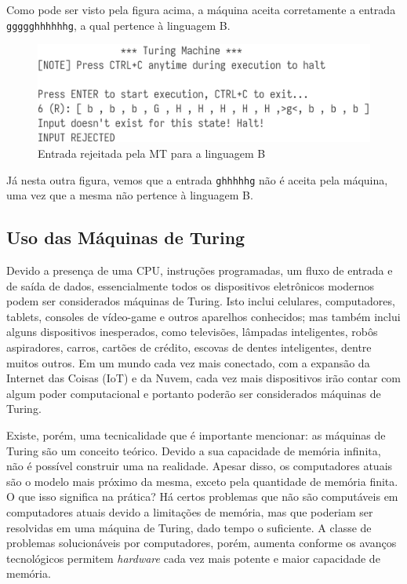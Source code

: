 \documentclass[12pt,fleqn]{article}
\begin{document}
Como pode ser visto pela figura acima, a máquina aceita corretamente a entrada
\verb|ggggghhhhhhg|, a qual pertence à linguagem B.

\begin{figure}[H]
    \centering
    \includegraphics[width=0.8\linewidth]{img/tm_language_b_rejected}
    \caption{Entrada rejeitada pela MT para a linguagem B}
\end{figure}

Já nesta outra figura, vemos que a entrada \verb|ghhhhhg| não é aceita pela
máquina, uma vez que a mesma não pertence à linguagem B.

\subsection{Uso das Máquinas de Turing}
Devido a presença de uma CPU, instruções programadas, um fluxo de entrada e de
saída de dados, essencialmente todos os dispositivos eletrônicos modernos podem
ser considerados máquinas de Turing. Isto inclui celulares, computadores,
tablets, consoles de vídeo-game e outros aparelhos conhecidos; mas também inclui
alguns dispositivos inesperados, como televisões, lâmpadas inteligentes, robôs
aspiradores, carros, cartões de crédito, escovas de dentes inteligentes, dentre
muitos outros. Em um mundo cada vez mais conectado, com a expansão da Internet
das Coisas (IoT) e da Nuvem, cada vez mais dispositivos irão contar com algum
poder computacional e portanto poderão ser considerados máquinas de Turing.

Existe, porém, uma tecnicalidade que é importante mencionar: as máquinas de
Turing são um conceito teórico. Devido a sua capacidade de memória infinita, não
é possível construir uma na realidade. Apesar disso, os computadores atuais são
o modelo mais próximo da mesma, exceto pela quantidade de memória finita. O que
isso significa na prática? Há certos problemas que não são computáveis em
computadores atuais devido a limitações de memória, mas que poderiam ser
resolvidas em uma máquina de Turing, dado tempo o suficiente. A classe de
problemas solucionáveis por computadores, porém, aumenta conforme os avanços
tecnológicos permitem \textit{hardware} cada vez mais potente e maior capacidade
de memória.
\end{document}
